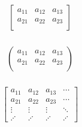 \documentclass{article}
\begin{document}
\begin{center}
        \begin{align*}
            \left[ \begin{array}{ccc}
                a_{11} & a_{12} & a_{13}\\
                a_{21} & a_{22} & a_{23}\\
            \end{array} \right]
        \end{align*}\\[5pt]
        \begin{align*}
            \begin{pmatrix}
                a_{11} & a_{12} & a_{13}\\
                a_{21} & a_{22} & a_{23}\\
            \end{pmatrix}
        \end{align*}\\[5pt]
        \begin{align*}
            \begin{bmatrix}
                a_{11} & a_{12} & a_{13} & \cdots\\
                a_{21} & a_{22} & a_{23} & \cdots\\
                \vdots & \vdots & \vdots & \ddots\\
                \iddots & \iddots & \iddots & \iddots
            \end{bmatrix}
        \end{align*}\\[5pt]
    \end{center}
\end{document}
